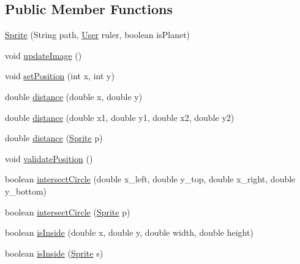 \subsection*{Public Member Functions}
\begin{DoxyCompactItemize}
\item 
\hyperlink{classfr_1_1projet_1_1groupe40_1_1model_1_1_sprite_a043ed3640e90657015dc454876720100}{Sprite} (String path, \hyperlink{classfr_1_1projet_1_1groupe40_1_1client_1_1_user}{User} ruler, boolean is\+Planet)
\item 
void \hyperlink{classfr_1_1projet_1_1groupe40_1_1model_1_1_sprite_a8a3d06ac02e46e0348484037b5a2fbc6}{update\+Image} ()
\item 
void \hyperlink{classfr_1_1projet_1_1groupe40_1_1model_1_1_sprite_a4515fd9dbb0b4cd244a634d5c3a992a8}{set\+Position} (int x, int y)
\item 
double \hyperlink{classfr_1_1projet_1_1groupe40_1_1model_1_1_sprite_ab0288610b737af0f2419dd47001d11af}{distance} (double x, double y)
\item 
double \hyperlink{classfr_1_1projet_1_1groupe40_1_1model_1_1_sprite_a9352edb5b8b5b143fae4362e28e4a421}{distance} (double x1, double y1, double x2, double y2)
\item 
double \hyperlink{classfr_1_1projet_1_1groupe40_1_1model_1_1_sprite_adc22b47a658c0520707fb5114d2aa91e}{distance} (\hyperlink{classfr_1_1projet_1_1groupe40_1_1model_1_1_sprite}{Sprite} p)
\item 
void \hyperlink{classfr_1_1projet_1_1groupe40_1_1model_1_1_sprite_a126d99f3cbffe3706cec9faa2939e1a2}{validate\+Position} ()
\item 
boolean \hyperlink{classfr_1_1projet_1_1groupe40_1_1model_1_1_sprite_a9ceeb5eaf5ef05f293d4a1003bad9239}{intersect\+Circle} (double x\+\_\+left, double y\+\_\+top, double x\+\_\+right, double y\+\_\+bottom)
\item 
boolean \hyperlink{classfr_1_1projet_1_1groupe40_1_1model_1_1_sprite_a57c9dbd46161d5b6811e86a7c9307a36}{intersect\+Circle} (\hyperlink{classfr_1_1projet_1_1groupe40_1_1model_1_1_sprite}{Sprite} p)
\item 
boolean \hyperlink{classfr_1_1projet_1_1groupe40_1_1model_1_1_sprite_a03548b31b8fcd9b96713cbfa751ba8c5}{is\+Inside} (double x, double y, double width, double height)
\item 
boolean \hyperlink{classfr_1_1projet_1_1groupe40_1_1model_1_1_sprite_a72a8e0699c8d320b462f1d2ab185484d}{is\+Inside} (\hyperlink{classfr_1_1projet_1_1groupe40_1_1model_1_1_sprite}{Sprite} s)

\end{DoxyCompactItemize}
